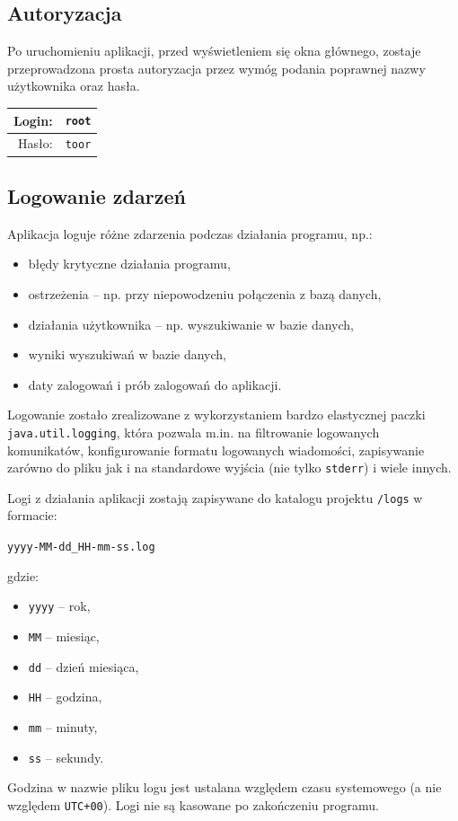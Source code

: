 \documentclass[a4paper,titlepage]{article}
\theoremstyle{break}
\numberwithin{equation}{subsection}
\begin{document}

\subsection{Autoryzacja}

Po uruchomieniu aplikacji, przed wyświetleniem się okna głównego, zostaje przeprowadzona prosta autoryzacja przez wymóg podania poprawnej nazwy użytkownika oraz hasła.

\begin{tabular}{r|l}
Login: & \texttt{root}\\
\hline
Hasło: & \texttt{toor}\\
\end{tabular}


\subsection{Logowanie zdarzeń}
\label{sec:logowanie}

Aplikacja loguje różne zdarzenia podczas działania programu, np.:
\begin{itemize}
	\item błędy krytyczne działania programu,
	\item ostrzeżenia -- np. przy niepowodzeniu połączenia z bazą danych,
	\item działania użytkownika -- np. wyszukiwanie w bazie danych,
	\item wyniki wyszukiwań w bazie danych,
	\item daty zalogowań i prób zalogowań do aplikacji.
\end{itemize}
Logowanie zostało zrealizowane z wykorzystaniem bardzo elastycznej paczki \texttt{java.util.logging}, która pozwala m.in. na filtrowanie logowanych komunikatów, konfigurowanie formatu logowanych wiadomości, zapisywanie zarówno do pliku jak i na standardowe wyjścia (nie tylko \texttt{stderr}) i wiele innych.

Logi z działania aplikacji zostają zapisywane do katalogu projektu \texttt{/logs} w formacie:
\begin{center}
\texttt{yyyy-MM-dd\_HH-mm-ss.log}
\end{center}
gdzie:
\begin{itemize}
	\item \texttt{yyyy} -- rok,
	\item \texttt{MM} -- miesiąc,
	\item \texttt{dd} -- dzień miesiąca,
	\item \texttt{HH} -- godzina,
	\item \texttt{mm} -- minuty,
	\item \texttt{ss} -- sekundy.
\end{itemize}
Godzina w nazwie pliku logu jest ustalana względem czasu systemowego (a nie względem \texttt{UTC+00}). Logi nie są kasowane po zakończeniu programu.
\end{document}
